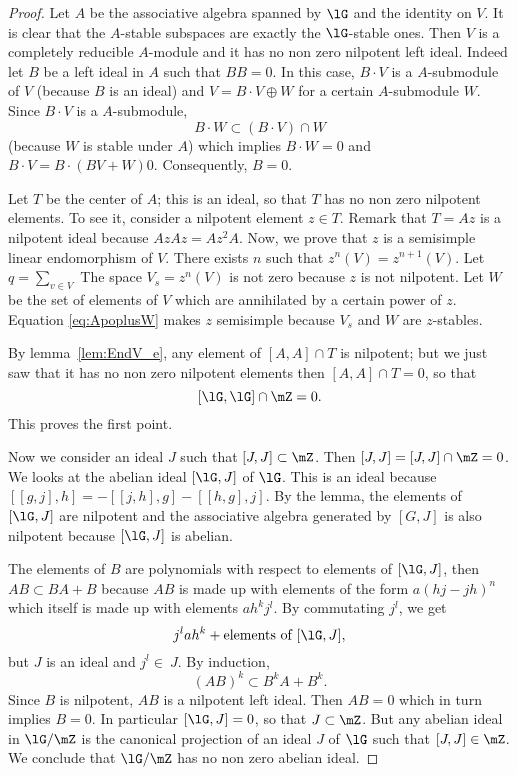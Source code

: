 \begin{proof}
Let $A$ be the associative algebra spanned by $\lG$ and the identity on $V$. It is clear that the $A$-stable subspaces are exactly the $\lG$-stable ones. Then $V$ is a completely reducible $A$-module and it has no non zero nilpotent left ideal. Indeed let $B$ be a left ideal in $A$ such that $BB=0$. In this case, $B\cdot V$ is a $A$-submodule of $V$ (because $B$ is an ideal) and $V=B\cdot V\oplus W$ for a certain $A$-submodule $W$. Since $B\cdot V$ is a $A$-submodule,
\[
B\cdot W\subset(B\cdot V)\cap W
\]
(because $W$ is stable under $A$) which implies $B\cdot W=0$ and $B\cdot V=B\cdot(BV+W) 0$. Consequently, $B=0$.

Let $T$ be the center of $A$; this is an ideal, so that $T$ has no non zero nilpotent elements. To see it, consider a nilpotent element $z\in T$. Remark that $T=Az$  is a nilpotent ideal because $AzAz=Az^2A$. Now, we prove that $z$ is a semisimple linear endomorphism of $V$. There exists \( n\) such that $z^n(V)=z^{n+1}(V)$. Let $q=\sum_{v\in V}$  The space $V_s=z^n(V)$ is not zero because $z$ is not nilpotent. Let $W$ be the set of elements of $V$ which are annihilated by a certain power of $z$. Equation \eqref{eq:ApoplusW} makes $z$ semisimple because $V_s$ and $W$ are $z$-stables.

By lemma~\ref{lem:EndV_e}, any element of $[A,A]\cap T$ is nilpotent; but we just saw that it has no non zero nilpotent elements then $[A,A]\cap T=0$, so that
\[
[\lG,\lG]\cap\mZ=0.
\]
This proves the first point.

Now we consider  an ideal $J$ such that $[J,J]\subset\mZ$. Then $[J,J]=[J,J]\cap \mZ=0$. We looks at the abelian ideal $[\lG,J]$ of $\lG$. This is an ideal because $[[g,j],h]=-[[j,h],g]-[[h,g],j]$. By the lemma, the elements of $[\lG,J]$ are nilpotent and the associative algebra generated by $[G,J]$ is also nilpotent because $[\lG,J]$ is abelian.

The elements of $B$ are polynomials with respect to elements of $[\lG,J]$, then $AB\subset BA+B$ because $AB$ is made up with elements of the form $a(hj-jh)^n$ which itself is made up with elements $ah^kj^l$. By commutating $j^l$, we get
\[
j^lah^k+\text{elements of } [\lG,J],
\]
but $J$ is an ideal and $j^l\in\ J$. By induction,
\begin{equation}
(AB)^k\subset B^kA+B^k.
\end{equation}
Since $B$ is nilpotent, $AB$ is a nilpotent left ideal. Then $AB=0$ which in turn implies $B=0$. In particular $[\lG,J]=0$, so that $J\subset\mZ$. But any abelian ideal in $\lG/\mZ$ is the canonical projection of an ideal $J$ of $\lG$ such that $[J,J]\in\mZ$. We conclude that $\lG/\mZ$ has no non zero abelian ideal.

\end{proof}


